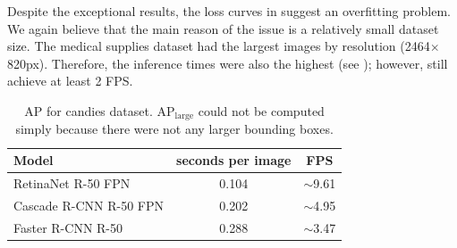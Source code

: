 Despite the exceptional results, the loss curves in
 suggest an overfitting problem. We again believe that
the main reason of the issue is a relatively small dataset size. The medical
supplies dataset had the largest images by resolution (2464$\times$820px).
Therefore, the inference times were also the highest (see
); however, still achieve at least 2 FPS.

\begin{table}[H]
	\centering
	\begin{tabular}{l|c|c}
		Model                  & seconds per image & FPS                               \\
		\hline
		RetinaNet R-50 FPN     & 0.104             & \scriptsize $\sim$\normalsize9.61 \\
		Cascade R-CNN R-50 FPN & 0.202             & \scriptsize $\sim$\normalsize4.95 \\
		Faster R-CNN R-50      & 0.288             & \scriptsize $\sim$\normalsize3.47 \\
	\end{tabular}
	\caption{AP for candies dataset. AP$_\text{large}$ could not be computed
		simply because there were not any larger bounding boxes.}
	\label{tab:medical_times}
\end{table}

